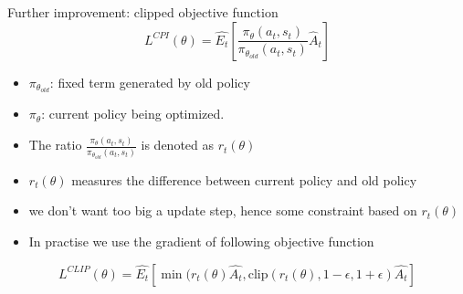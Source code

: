 \begin{frame}{Further improvement: clipped objective function}
\begin{equation}
                \label{objPPO}
                L^{CPI}(\theta) = \hat{E_t}[\frac{\pi_\theta(a_t,s_t)}{\pi_{\theta_{old}}(a_t,s_t)}\hat{A}_{t}]
            \end{equation}
\begin{itemize}
    \item $\pi_{\theta_{old}}$: fixed term generated by old policy\vspace{0.2cm}
    \item $\pi_{\theta}$: current policy being optimized. \vspace{0.2cm}
    \item The ratio $\frac{\pi_\theta(a_t,s_t)}{\pi_{\theta_{old}}(a_t,s_t)}$ is denoted as $r_t(\theta)$\vspace{0.2cm}
    \item $r_t(\theta)$ measures the difference between current policy and old policy\vspace{0.2cm}
    \item we don't want too big a update step, hence some constraint based on $r_t(\theta)$\vspace{0.2cm}
    \item In practise we use the gradient of following objective function\vspace{0.2cm}
\end{itemize}
\begin{equation}
    \label{clipPPO}
    L^{CLIP}(\theta) = \hat{E_t}[\min(r_t(\theta)\hat{A_t},\mathrm{clip}(r_t(\theta),1-\epsilon,1+\epsilon)\hat{A_t}]
\end{equation}
\end{frame}

